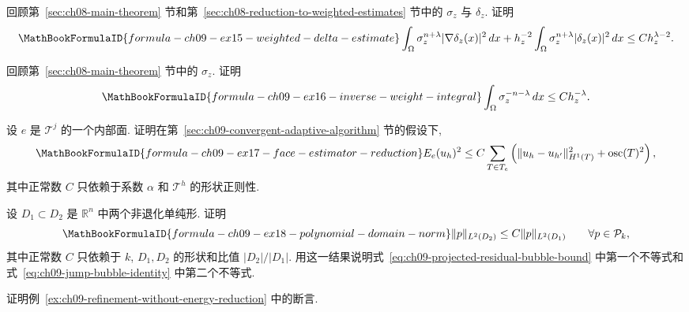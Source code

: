 \begin{MBExercise}
\label{exr:ch09-15}
回顾第~\ref{sec:ch08-main-theorem} 节和第~\ref{sec:ch08-reduction-to-weighted-estimates} 节中的 $\sigma_z$ 与 $\delta_z$. 证明
\[
\MathBookFormulaID{formula-ch09-ex15-weighted-delta-estimate}
\int_\Omega\sigma_z^{n+\lambda}|\nabla\delta_z(x)|^2\,dx
+h_z^{-2}\int_\Omega\sigma_z^{n+\lambda}|\delta_z(x)|^2\,dx
\leq Ch_z^{\lambda-2}.
\]
\end{MBExercise}

\begin{MBExercise}
\label{exr:ch09-16}
回顾第~\ref{sec:ch08-main-theorem} 节中的 $\sigma_z$. 证明
\[
\MathBookFormulaID{formula-ch09-ex16-inverse-weight-integral}
\int_\Omega\sigma_z^{-n-\lambda}\,dx\leq Ch_z^{-\lambda}.
\]
\end{MBExercise}

\begin{MBExercise}
\label{exr:ch09-17}
设 $e$ 是 $\mathcal T^j$ 的一个内部面. 证明在第~\ref{sec:ch09-convergent-adaptive-algorithm} 节的假设下,
\[
\MathBookFormulaID{formula-ch09-ex17-face-estimator-reduction}
E_e(u_h)^2
\leq C\sum_{T\in T_e}
\left(\|u_h-u_{h'}\|_{H^1(T)}^2+\operatorname{osc}(T)^2\right),
\]
其中正常数 $C$ 只依赖于系数 $\alpha$ 和 $\mathcal T^h$ 的形状正则性.
\end{MBExercise}

\begin{MBExercise}
\label{exr:ch09-18}
设 $D_1\subset D_2$ 是 $\mathbb R^n$ 中两个非退化单纯形. 证明
\[
\MathBookFormulaID{formula-ch09-ex18-polynomial-domain-norm}
\|p\|_{L^2(D_2)}\leq C\|p\|_{L^2(D_1)}
\qquad\forall p\in\mathcal P_k,
\]
其中正常数 $C$ 只依赖于 $k$, $D_1,D_2$ 的形状和比值 $|D_2|/|D_1|$. 用这一结果说明式~\eqref{eq:ch09-projected-residual-bubble-bound} 中第一个不等式和式~\eqref{eq:ch09-jump-bubble-identity} 中第二个不等式.
\end{MBExercise}

\begin{MBExercise}
\label{exr:ch09-19}
证明例~\ref{ex:ch09-refinement-without-energy-reduction} 中的断言.
\end{MBExercise}
